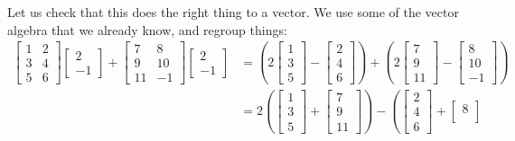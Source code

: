 Let us check that this does the right thing to a vector.  We use some
of the vector algebra that we already know, and
regroup things:
\begin{equation*}
\begin{split}
\begin{bmatrix}
1 & 2 \\
3 & 4 \\
5 & 6
\end{bmatrix}
\begin{bmatrix}
2 \\ -1
\end{bmatrix}
+
\begin{bmatrix}
7 & 8 \\
9 & 10 \\
11 & -1
\end{bmatrix}
\begin{bmatrix}
2 \\ -1
\end{bmatrix}
& =
\left(
2
\begin{bmatrix}
1 \\
3 \\
5
\end{bmatrix}
-
\begin{bmatrix}
2 \\
4 \\
6
\end{bmatrix}
\right)
+
\left(
2
\begin{bmatrix}
7 \\
9 \\
11
\end{bmatrix}
-
\begin{bmatrix}
8 \\
10 \\
-1
\end{bmatrix}
\right)
\\
& = 
2
\left(
\begin{bmatrix}
1 \\
3 \\
5
\end{bmatrix}
+
\begin{bmatrix}
7 \\
9 \\
11
\end{bmatrix}
\right)
-
\left(
\begin{bmatrix}
2 \\
4 \\
6
\end{bmatrix}
+
\begin{bmatrix}
8 \\

\end{bmatrix}
\end{split}
\end{equation*}
